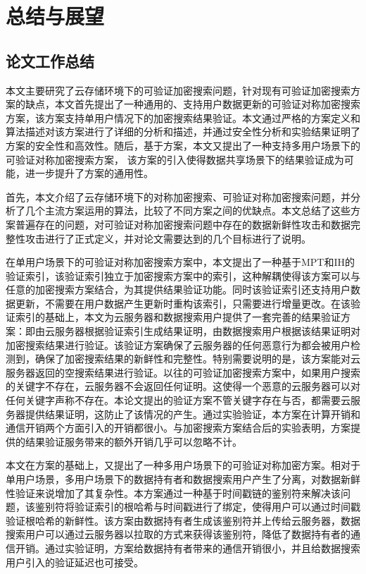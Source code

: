 \chapter{总结与展望}
\label{cha:conclusion}
\section{论文工作总结}
本文主要研究了云存储环境下的可验证加密搜索问题，针对现有可验证加密搜索方案的缺点，本文首先提出了一种通用的、支持用户数据更新的可验证对称加密搜索方案\single，该方案支持单用户情况下的加密搜索结果验证。本文通过严格的方案定义和算法描述对该方案进行了详细的分析和描述，并通过安全性分析和实验结果证明了\single 方案的安全性和高效性。随后，基于\single 方案，本文又提出了一种支持多用户场景下的可验证对称加密搜索方案\multi ， 该方案的引入使得数据共享场景下的结果验证成为可能，进一步提升了方案的通用性。

首先，本文介绍了云存储环境下的对称加密搜索、可验证对称加密搜索问题，并分析了几个主流方案运用的算法，比较了不同方案之间的优缺点。本文总结了这些方案普遍存在的问题，对可验证对称加密搜索问题中存在的数据新鲜性攻击和数据完整性攻击进行了正式定义，并对论文需要达到的几个目标进行了说明。

在单用户场景下的可验证对称加密搜索方案\single 中，本文提出了一种基于MPT和IH的验证索引，该验证索引独立于加密搜索方案中的索引，这种解耦使得该方案可以与任意的加密搜索方案结合，为其提供结果验证功能。同时该验证索引还支持用户数据更新，不需要在用户数据产生更新时重构该索引，只需要进行增量更改。在该验证索引的基础上，本文为云服务器和数据搜索用户提供了一套完善的结果验证方案：即由云服务器根据验证索引生成结果证明，由数据搜索用户根据该结果证明对加密搜索结果进行验证。该验证方案确保了云服务器的任何恶意行为都会被用户检测到，确保了加密搜索结果的新鲜性和完整性。特别需要说明的是，该方案能对云服务器返回的空搜索结果进行验证。以往的可验证加密搜索方案中，如果用户搜索的关键字不存在，云服务器不会返回任何证明。这使得一个恶意的云服务器可以对任何关键字声称不存在。本论文提出的验证方案不管关键字存在与否，都需要云服务器提供结果证明，这防止了该情况的产生。通过实验验证，本方案在计算开销和通信开销两个方面引入的开销都很小。与加密搜索方案结合后的实验表明，\single 方案提供的结果验证服务带来的额外开销几乎可以忽略不计。

本文在\single 方案的基础上，又提出了一种多用户场景下的可验证对称加密方案\multi 。相对于单用户场景，多用户场景下的数据持有者和数据搜索用户产生了分离，对数据新鲜性验证来说增加了其复杂性。本方案通过一种基于时间戳链的鉴别符来解决该问题，该鉴别符将验证索引的根哈希与时间戳进行了绑定，使得用户可以通过时间戳验证根哈希的新鲜性。该方案由数据持有者生成该鉴别符并上传给云服务器，数据搜索用户可以通过云服务器以拉取的方式来获得该鉴别符，降低了数据持有者的通信开销。通过实验证明，\multi 方案给数据持有者带来的通信开销很小，并且给数据搜索用户引入的验证延迟也可接受。

